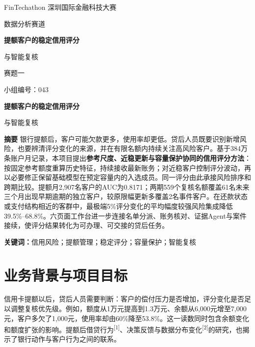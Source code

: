 \documentclass[a4paper,10pt]{article}
\begin{document}
\begin{titlepage}
\centering
\vspace*{34mm}
{\fontsize{14bp}{21bp} FinTechathon 深圳国际金融科技大赛\par}
\vspace{8mm}
{\fontsize{12bp}{18bp}\selectfont 数据分析赛道\par}
\vspace{32mm}
{\fontsize{21bp}{33bp}\selectfont\bfseries 提额客户的稳定信用评分\par 与智能复核\par}
\vspace{15mm}
{\fontsize{13bp}{20bp}\selectfont 赛题一\par}
\vspace{36mm}
{\fontsize{12bp}{18bp}\selectfont 小组编号：043\par}
\end{titlepage}
\begin{center}{\fontsize{14bp}{21bp}\selectfont\bfseries 提额客户的稳定信用评分\par 与智能复核\par}\end{center}

\noindent\textbf{摘要}\quad
银行提额后，客户可能欠款更多，使用率却更低。贷后人员既要识别新增风险，也要辨清评分变化的来源，并在有限名额内持续关注高风险客户。基于384万条账户月记录，本项目提出\textbf{参考尺度、近稳更新与容量保护协同的信用评分方法}：按固定参考额度重算历史特征，持续接收最新账务；对近稳客户控制评分波动，再以必要修正保留基础模型在预定容量内的入选成员。同一评分由此承接风险排序和跨期比较。提额月2,907名客户的AUC为0.8171；两期559个复核名额覆盖61名未来三个月出现早期逾期的独立客户，较原限幅更新多覆盖2名事件客户。在还款状态或支付结构相近的客群中，最极端5\%评分变化的平均幅度较强风险集成降低39.5\%--68.8\%。六页面工作台进一步连接名单分派、账务核对、证据Agent与案件接续，使评分结果转化为可办理、可交接的贷后任务。

\par\noindent\textbf{关键词：}信用风险；提额管理；稳定评分；容量保护；智能复核

\section{业务背景与项目目标}
信用卡提额以后，贷后人员需要判断：客户的偿付压力是否增加，评分变化是否足以调整复核优先级。例如，额度从1万元提高到1.3万元、余额从6,000元增至7,000元，客户多欠了1,000元，使用率却由60\%降至53.8\%。这一读数同时包含余额变化和额度扩张的影响。提额后借贷行为\textsuperscript{[1]}、决策反馈与数据分布变化\textsuperscript{[2]}的研究，也揭示了银行动作与客户行为之间的联系。
\end{document}
